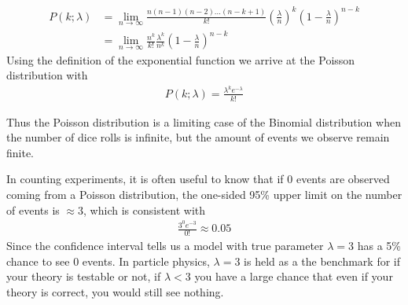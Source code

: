 \begin{align}
P(k; \lambda) &= \lim_{n\to \infty} \frac{n(n-1)(n-2)...(n-k+1)}{k!}\left(\frac{\lambda}{n}\right)^k\left(1-\frac{\lambda}{n}\right)^{n-k}\\
&= \lim_{n\to \infty}\frac{n^k}{k!}\frac{\lambda^k}{n^k}\left(1-\frac{\lambda}{n}\right)^{n-k}
\end{align}
Using the definition of the exponential function we arrive at the Poisson distribution with
\begin{align}
P(k; \lambda) = \frac{\lambda^ke^{-\lambda}}{k!}
\end{align}

Thus the Poisson distribution is a limiting case of the Binomial distribution when the number of dice rolls is infinite, but the amount of events we observe remain finite.

In counting experiments, it is often useful to know that if 0 events are observed coming from a Poisson distribution, the one-sided 95\% upper limit on the number of events is $\approx 3$, which is consistent with
\begin{align}
	\frac{3^0e^{-3}}{0!} \approx 0.05
\end{align}
Since the confidence interval tells us a model with true parameter $\lambda=3$ has a 5\% chance to see 0 events. In particle physics, $\lambda=3$ is held as a the benchmark for if your theory is testable or not, if $\lambda < 3$ you have a large chance that even if your theory is correct, you would still see nothing. 



